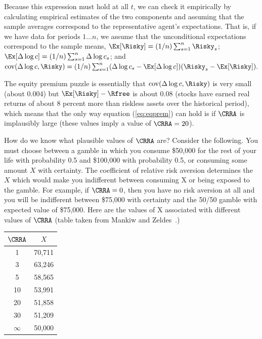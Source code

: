 \documentclass{handout}
\begin{document}
\vspace{.25in}



Because this expression must hold at all $t$, we can check it 
empirically by calculating empirical estimates of the two components 
and assuming that the sample averages correspond to the representative 
agent's expectations.  That is, if we have data for periods $1 \ldots 
n $, we assume that the unconditional expectations correspond to the 
sample means, $\Ex [\Risky] = (1/n) \sum_{s=1}^{n} \Risky_{s}$; $\Ex [\Delta 
\log c] = (1/n) \sum_{s=1}^{n} \Delta \log c_{s}$; and 
$\text{cov}(\Delta \log c,\Risky) = (1/n) 
\sum_{s=1}^{n} (\Delta \log c_{s} - \Ex [\Delta \log 
c])(\Risky_{s}-\Ex [\Risky]).$

The equity premium puzzle is essentially that $\text{cov}(\Delta \log 
c,\Risky)$ is very small (about 0.004) but $\Ex [\Risky]-\Rfree$ is about 0.08 
(stocks have earned real returns of about 8 percent more than riskless 
assets over the historical period), which means that the only way 
equation (\ref{eq:eqprem}) can hold is if $\CRRA$ is implausibly large 
(these values imply a value of $\CRRA=20$).

How do we know what plausible values of $\CRRA$ are?  Consider the 
following.  You must choose between a gamble in which you consume 
\$50,000 for the rest of your life with probability 0.5 and \$100,000 
with probability 0.5, or consuming some amount $X$ with certainty.  
The coefficient of relative risk aversion determines the $X$ which 
would make you indifferent between consuming X or being exposed to the 
gamble.  For example, if $\CRRA = 0$, then you have no risk aversion at 
all and you will be indifferent between \$75,000 with certainty and 
the 50/50 gamble with expected value of \$75,000.  Here are the values 
of X associated with different values of $\CRRA$ (table taken from 
Mankiw and Zeldes~\cite{mankiw&zeldes:stockholders}.)

\vspace{.25in}

\begin{table}
\center
\begin{tabular}{|c|c|}
\hline  $\CRRA$  & $     X $ 
\\ \hline
        1       &       70,711
\\      3       &       63,246
\\      5       &       58,565
\\      10      &       53,991
\\      20      &       51,858
\\      30      &       51,209
\\      $\infty$        &       50,000 
\\ \hline
\end{tabular}
\end{table}
\end{document}
